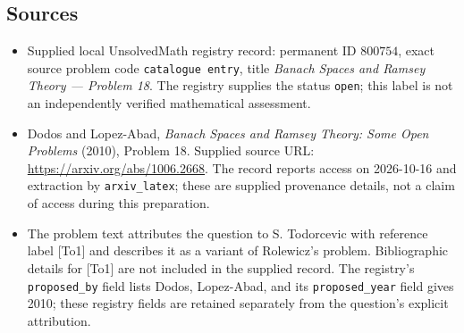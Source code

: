 \documentclass[11pt]{article}
\begin{document}
\subsection{Sources}
\begin{itemize}
\item Supplied local UnsolvedMath registry record: permanent ID \(800754\), exact source problem code \texttt{catalogue entry}, title \emph{Banach Spaces and Ramsey Theory --- Problem 18}. The registry supplies the status \texttt{open}; this label is not an independently verified mathematical assessment.
\item Dodos and Lopez-Abad, \emph{Banach Spaces and Ramsey Theory: Some Open Problems} (2010), Problem 18. Supplied source URL: \url{https://arxiv.org/abs/1006.2668}. The record reports access on 2026-10-16 and extraction by \texttt{arxiv\_latex}; these are supplied provenance details, not a claim of access during this preparation.
\item The problem text attributes the question to S. Todorcevic with reference label [To1] and describes it as a variant of Rolewicz's problem. Bibliographic details for [To1] are not included in the supplied record. The registry's \texttt{proposed\_by} field lists Dodos, Lopez-Abad, and its \texttt{proposed\_year} field gives 2010; these registry fields are retained separately from the question's explicit attribution.
\end{itemize}
\end{document}
